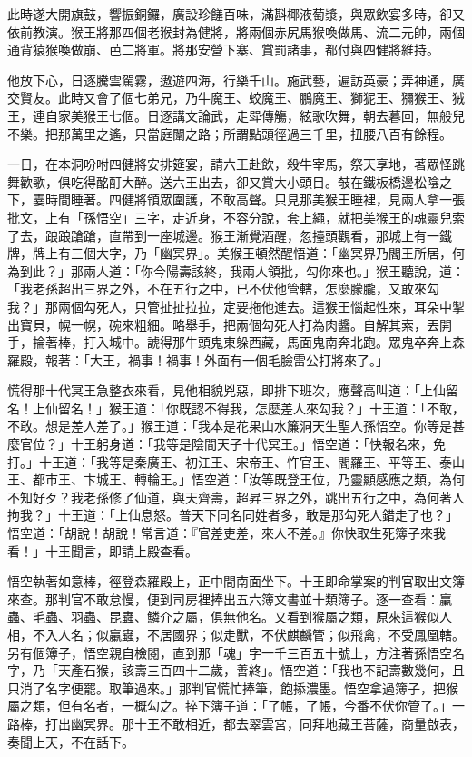 此時遂大開旗鼓，響振銅鑼，廣設珍饈百味，滿斟椰液萄漿，與眾飲宴多時，卻又依前教演。猴王將那四個老猴封為健將，將兩個赤尻馬猴喚做馬、流二元帥，兩個通背猿猴喚做崩、芭二將軍。將那安營下寨、賞罰諸事，都付與四健將維持。

他放下心，日逐騰雲駕霧，遨遊四海，行樂千山。施武藝，遍訪英豪；弄神通，廣交賢友。此時又會了個七弟兄，乃牛魔王、蛟魔王、鵬魔王、獅狔王、獼猴王、狨王，連自家美猴王七個。日逐講文論武，走斝傳觴，絃歌吹舞，朝去暮回，無般兒不樂。把那萬里之遙，只當庭闈之路；所謂點頭徑過三千里，扭腰八百有餘程。

一日，在本洞吩咐四健將安排筵宴，請六王赴飲，殺牛宰馬，祭天享地，著眾怪跳舞歡歌，俱吃得酩酊大醉。送六王出去，卻又賞大小頭目。攲在鐵板橋邊松陰之下，霎時間睡著。四健將領眾圍護，不敢高聲。只見那美猴王睡裡，見兩人拿一張批文，上有「孫悟空」三字，走近身，不容分說，套上繩，就把美猴王的魂靈兒索了去，踉踉蹌蹌，直帶到一座城邊。猴王漸覺酒醒，忽擡頭觀看，那城上有一鐵牌，牌上有三個大字，乃「幽冥界」。美猴王頓然醒悟道：「幽冥界乃閻王所居，何為到此？」那兩人道：「你今陽壽該終，我兩人領批，勾你來也。」猴王聽說，道：「我老孫超出三界之外，不在五行之中，已不伏他管轄，怎麼朦朧，又敢來勾我？」那兩個勾死人，只管扯扯拉拉，定要拖他進去。這猴王惱起性來，耳朵中掣出寶貝，幌一幌，碗來粗細。略舉手，把兩個勾死人打為肉醬。自解其索，丟開手，掄著棒，打入城中。諕得那牛頭鬼東躲西藏，馬面鬼南奔北跑。眾鬼卒奔上森羅殿，報著：「大王，禍事！禍事！外面有一個毛臉雷公打將來了。」

慌得那十代冥王急整衣來看，見他相貌兇惡，即排下班次，應聲高叫道：「上仙留名！上仙留名！」猴王道：「你既認不得我，怎麼差人來勾我？」十王道：「不敢，不敢。想是差人差了。」猴王道：「我本是花果山水簾洞天生聖人孫悟空。你等是甚麼官位？」十王躬身道：「我等是陰間天子十代冥王。」悟空道：「快報名來，免打。」十王道：「我等是秦廣王、初江王、宋帝王、忤官王、閻羅王、平等王、泰山王、都市王、卞城王、轉輪王。」悟空道：「汝等既登王位，乃靈顯感應之類，為何不知好歹？我老孫修了仙道，與天齊壽，超昇三界之外，跳出五行之中，為何著人拘我？」十王道：「上仙息怒。普天下同名同姓者多，敢是那勾死人錯走了也？」悟空道：「胡說！胡說！常言道：『官差吏差，來人不差。』你快取生死簿子來我看！」十王聞言，即請上殿查看。

悟空執著如意棒，徑登森羅殿上，正中間南面坐下。十王即命掌案的判官取出文簿來查。那判官不敢怠慢，便到司房裡捧出五六簿文書並十類簿子。逐一查看：臝蟲、毛蟲、羽蟲、昆蟲、鱗介之屬，俱無他名。又看到猴屬之類，原來這猴似人相，不入人名；似臝蟲，不居國界；似走獸，不伏麒麟管；似飛禽，不受鳳凰轄。另有個簿子，悟空親自檢閱，直到那「魂」字一千三百五十號上，方注著孫悟空名字，乃「天產石猴，該壽三百四十二歲，善終」。悟空道：「我也不記壽數幾何，且只消了名字便罷。取筆過來。」那判官慌忙捧筆，飽掭濃墨。悟空拿過簿子，把猴屬之類，但有名者，一概勾之。捽下簿子道：「了帳，了帳，今番不伏你管了。」一路棒，打出幽冥界。那十王不敢相近，都去翠雲宮，同拜地藏王菩薩，商量啟表，奏聞上天，不在話下。

